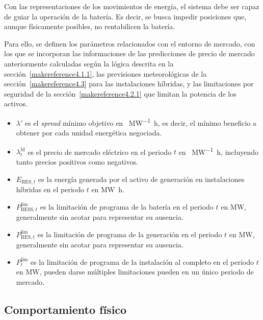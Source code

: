 Con las representaciones de los movimientos de energía, el sistema debe ser capaz de guiar la operación de la batería. Es decir, se busca impedir posiciones que, aunque físicamente posibles, no rentabilicen la batería.

Para ello, se definen los parámetros relacionados con el entorno de mercado, con los que se incorporan las informaciones de las predicciones de precio de mercado anteriormente calculadas según la lógica descrita en la sección~\ref{makereference4.1.1}, las previsiones meteorológicas de la sección~\ref{makereference4.3} para las instalaciones híbridas, y las limitaciones por seguridad de la sección~\ref{makereference4.2.1} que limitan la potencia de los activos.

\begin{itemize}

  \item \( \lambda' \) es el \textit{spread} mínimo objetivo en \si{\text{\euro}\per\mega\watt\hour}, es decir, el mínimo beneficio a obtener por cada unidad energética negociada.

  \item \( \lambda^{\mathrm{M}}_{t} \) es el precio de mercado eléctrico en el periodo \( t \) en \si{\text{\euro}\per\mega\watt\hour}, incluyendo tanto precios positivos como negativos.

  \item \( E_{\mathrm{RES}, t} \) es la energía generada por el activo de generación en instalaciones híbridas en el periodo \( t \) en \si{{\mega\watt\hour}}.

  \item \( P^{\text{lim}}_{\mathrm{BESS}, t} \) es la limitación de programa de la batería en el periodo \( t \) en \si{\mega\watt}, generalmente sin acotar para representar su ausencia.

  \item \( P^{\text{lim}}_{\mathrm{RES}, t} \) es la limitación de programa de la generación en el periodo \( t \) en \si{\mega\watt}, generalmente sin acotar para representar su ausencia.

  \item \( P^{\text{lim}}_{t} \) es la limitación de programa de la instalación al completo en el periodo \( t \) en \si{\mega\watt}, pueden darse múltiples limitaciones pueden en un único periodo de mercado.

\end{itemize}

\subsection{Comportamiento físico}%
\label{makereference5.1.5}

